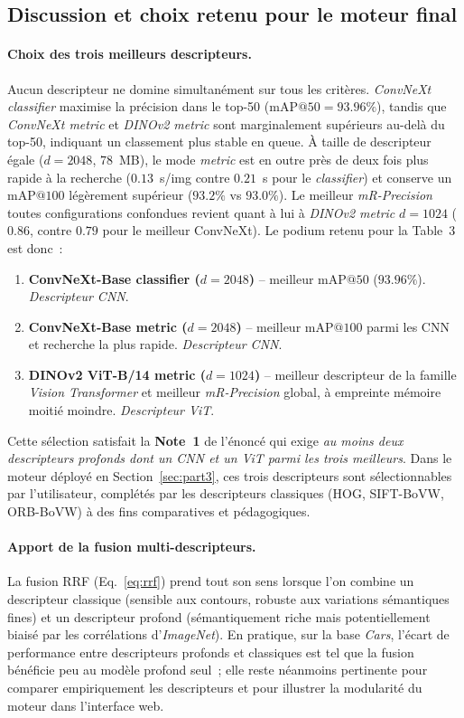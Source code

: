 \documentclass[a4paper,11pt]{article}
\begin{document}
\subsection{Discussion et choix retenu pour le moteur final}
\label{subsec:discussion_part1}

\paragraph{Choix des trois meilleurs descripteurs.}
Aucun descripteur ne domine simultanément sur tous les critères.
\textit{ConvNeXt classifier} maximise la précision dans le top-50
($\text{mAP}@50 = 93.96\%$), tandis que \textit{ConvNeXt metric} et
\textit{DINOv2 metric} sont marginalement supérieurs au-delà du top-50,
indiquant un classement plus stable en queue. À taille de descripteur
égale ($d=2048$, $78$~MB), le mode \textit{metric} est en outre près de
deux fois plus rapide à la recherche ($0.13$~s/img contre $0.21$~s pour
le \textit{classifier}) et conserve un $\text{mAP}@100$ légèrement
supérieur ($93.2\%$ vs $93.0\%$). Le meilleur \textit{mR-Precision}
toutes configurations confondues revient quant à lui à
\textit{DINOv2 metric} $d=1024$ ($0.86$, contre $0.79$ pour le meilleur
ConvNeXt). Le podium retenu pour la Table~3 est donc~:
\begin{enumerate}
    \item \textbf{ConvNeXt-Base classifier ($d=2048$)} -- meilleur
    $\text{mAP}@50$ ($93.96\%$). \emph{Descripteur CNN}.
    \item \textbf{ConvNeXt-Base metric ($d=2048$)} -- meilleur
    $\text{mAP}@100$ parmi les CNN et recherche la plus rapide.
    \emph{Descripteur CNN}.
    \item \textbf{DINOv2 ViT-B/14 metric ($d=1024$)} -- meilleur
    descripteur de la famille \emph{Vision Transformer} et meilleur
    \textit{mR-Precision} global, à empreinte mémoire moitié moindre.
    \emph{Descripteur ViT}.
\end{enumerate}
Cette sélection satisfait la \textbf{Note~1} de l'énoncé qui exige
\emph{au moins deux descripteurs profonds dont un CNN et un ViT parmi
les trois meilleurs}. Dans le moteur déployé en
Section~\ref{sec:part3}, ces trois descripteurs sont sélectionnables
par l'utilisateur, complétés par les descripteurs classiques
(HOG, SIFT-BoVW, ORB-BoVW) à des fins comparatives et pédagogiques.

\paragraph{Apport de la fusion multi-descripteurs.}
La fusion RRF (Eq.~\eqref{eq:rrf}) prend tout son sens lorsque l'on
combine un descripteur classique (sensible aux contours, robuste aux
variations sémantiques fines) et un descripteur profond (sémantiquement
riche mais potentiellement biaisé par les corrélations
d'\textit{ImageNet}). En pratique, sur la base \textit{Cars}, l'écart de
performance entre descripteurs profonds et classiques est tel que la
fusion bénéficie peu au modèle profond seul~; elle reste néanmoins
pertinente pour comparer empiriquement les descripteurs et pour
illustrer la modularité du moteur dans l'interface web.
\end{document}
